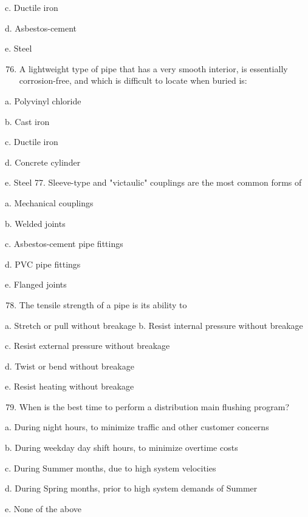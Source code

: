 \documentclass[10pt]{article}
\begin{document}
\begin{enumerate}
\begin{enumerate}
c. Ductile iron

d. Asbestos-cement

e. Steel

\begin{enumerate}
  \setcounter{enumi}{75}
  \item A lightweight type of pipe that has a very smooth interior, is essentially corrosion-free, and which is difficult to locate when buried is:
\end{enumerate}

a. Polyvinyl chloride

b. Cast iron

c. Ductile iron

d. Concrete cylinder

e. Steel 77. Sleeve-type and "victaulic" couplings are the most common forms of

a. Mechanical couplings

b. Welded joints

c. Asbestos-cement pipe fittings

d. PVC pipe fittings

e. Flanged joints

\begin{enumerate}
  \setcounter{enumi}{77}
  \item The tensile strength of a pipe is its ability to
\end{enumerate}

a. Stretch or pull without breakage b. Resist internal pressure without breakage

c. Resist external pressure without breakage

d. Twist or bend without breakage

e. Resist heating without breakage

\begin{enumerate}
  \setcounter{enumi}{78}
  \item When is the best time to perform a distribution main flushing program?
\end{enumerate}

a. During night hours, to minimize traffic and other customer concerns

b. During weekday day shift hours, to minimize overtime costs

c. During Summer months, due to high system velocities

d. During Spring months, prior to high system demands of Summer

e. None of the above


\end{enumerate}
\end{enumerate}
\end{document}
